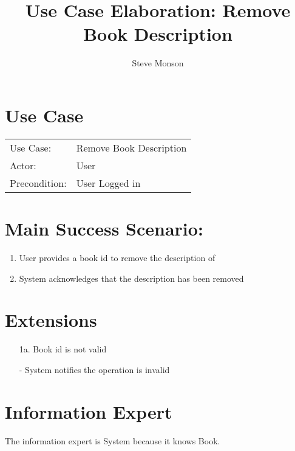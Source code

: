 \documentclass{article}
\title{Use Case Elaboration: Remove Book Description}
\author{ Steve Monson }
\begin{document}
\maketitle


\section*{Use Case}
\begin{tabular}{l l}
Use Case:     & Remove Book Description\\
Actor:        & User\\
Precondition: & User Logged in\\
\end{tabular}


\section*{Main Success Scenario:}

\begin{enumerate}
    \item User provides a book id to remove the description of
    \item System acknowledges that the description has been removed
    
\end{enumerate}

\section*{Extensions}

\begin{itemize}
    \item [1a.] Book id is not valid
    
        - System notifies the operation is invalid
                            
\end{itemize}


\section*{Information Expert}
The information expert is System because it knows Book. 
\end{document}
